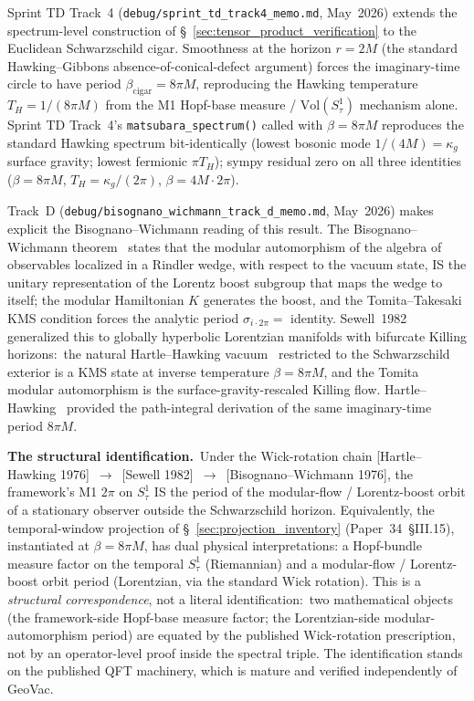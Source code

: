 \documentclass[11pt]{article}
\begin{document}
Sprint TD Track~4 (\texttt{debug/sprint\_td\_track4\_memo.md}, May~2026)
extends the spectrum-level construction of
\S~\ref{sec:tensor_product_verification} to the Euclidean Schwarzschild
cigar.  Smoothness at the horizon $r = 2M$ (the standard Hawking--Gibbons
absence-of-conical-defect argument) forces the imaginary-time circle to
have period $\beta_{\mathrm{cigar}} = 8\pi M$, reproducing the Hawking
temperature $T_H = 1/(8\pi M)$ from the M1 Hopf-base measure /
$\mathrm{Vol}(S^1_\tau)$ mechanism alone.  Sprint TD Track~4's
\texttt{matsubara\_spectrum()} called with $\beta = 8\pi M$ reproduces the
standard Hawking spectrum bit-identically (lowest bosonic mode $1/(4M) =
\kappa_g$ surface gravity; lowest fermionic $\pi T_H$); sympy residual
zero on all three identities ($\beta = 8\pi M$,
$T_H = \kappa_g/(2\pi)$, $\beta = 4M \cdot 2\pi$).

Track~D (\texttt{debug/bisognano\_wichmann\_track\_d\_memo.md},
May~2026) makes explicit the Bisognano--Wichmann reading of this
result.  The Bisognano--Wichmann theorem~\cite{bisognano_wichmann1976}
states that the modular automorphism of the algebra of observables
localized in a Rindler wedge, with respect to the vacuum state, IS the
unitary representation of the Lorentz boost subgroup that maps the
wedge to itself; the modular Hamiltonian $K$ generates the boost, and
the Tomita--Takesaki KMS condition forces the analytic period
$\sigma_{i\cdot 2\pi} = $ identity.  Sewell~1982~\cite{sewell1982}
generalized this to globally hyperbolic Lorentzian manifolds with
bifurcate Killing horizons:\ the natural Hartle--Hawking
vacuum~\cite{hartle_hawking1976} restricted to the Schwarzschild
exterior is a KMS state at inverse temperature $\beta = 8\pi M$, and
the Tomita modular automorphism is the surface-gravity-rescaled Killing
flow.  Hartle--Hawking~\cite{hartle_hawking1976} provided the
path-integral derivation of the same imaginary-time period $8\pi M$.

\textbf{The structural identification.}\ Under the Wick-rotation chain
[Hartle--Hawking 1976]~$\to$~[Sewell 1982]~$\to$~[Bisognano--Wichmann
1976], the framework's M1 $2\pi$ on $S^1_\tau$ IS the period of the
modular-flow / Lorentz-boost orbit of a stationary observer outside the
Schwarzschild horizon.  Equivalently, the temporal-window projection
of \S~\ref{sec:projection_inventory} (Paper~34~§III.15), instantiated at
$\beta = 8\pi M$, has dual physical interpretations: a Hopf-bundle
measure factor on the temporal $S^1_\tau$ (Riemannian) and a
modular-flow / Lorentz-boost orbit period (Lorentzian, via the standard
Wick rotation).  This is a \emph{structural correspondence}, not a
literal identification:\ two mathematical objects (the framework-side
Hopf-base measure factor; the Lorentzian-side modular-automorphism
period) are equated by the published Wick-rotation prescription, not
by an operator-level proof inside the spectral triple.  The
identification stands on the published QFT machinery, which is mature
and verified independently of GeoVac.
\end{document}
